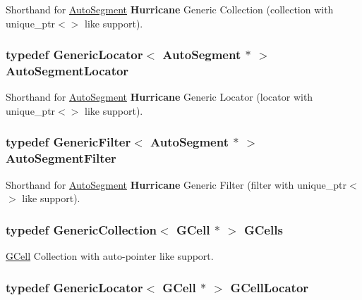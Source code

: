 Shorthand for \hyperlink{classKatabatic_1_1AutoSegment}{Auto\-Segment} {\bf Hurricane} Generic Collection (collection with {\ttfamily unique\-\_\-ptr$<$$>$} like support). \hypertarget{namespaceKatabatic_ace866cc8e09faf80f71a4087bb8e5870}{
\subsubsection[{Auto\-Segment\-Locator}]{\setlength{\rightskip}{0pt plus 5cm}typedef {\bf Generic\-Locator}$<$ {\bf Auto\-Segment} $\ast$ $>$ {\bf Auto\-Segment\-Locator}}}\label{namespaceKatabatic_ace866cc8e09faf80f71a4087bb8e5870}
Shorthand for \hyperlink{classKatabatic_1_1AutoSegment}{Auto\-Segment} {\bf Hurricane} Generic Locator (locator with {\ttfamily unique\-\_\-ptr$<$$>$} like support). \hypertarget{namespaceKatabatic_a13ffc994c98e1a878e61a927de0509c8}{
\subsubsection[{Auto\-Segment\-Filter}]{\setlength{\rightskip}{0pt plus 5cm}typedef {\bf Generic\-Filter}$<$ {\bf Auto\-Segment} $\ast$ $>$ {\bf Auto\-Segment\-Filter}}}\label{namespaceKatabatic_a13ffc994c98e1a878e61a927de0509c8}
Shorthand for \hyperlink{classKatabatic_1_1AutoSegment}{Auto\-Segment} {\bf Hurricane} Generic Filter (filter with {\ttfamily unique\-\_\-ptr$<$$>$} like support). \hypertarget{namespaceKatabatic_ab68f9dfbbc79fd999773beef8561bc31}{
\subsubsection[{G\-Cells}]{\setlength{\rightskip}{0pt plus 5cm}typedef {\bf Generic\-Collection}$<$ {\bf G\-Cell} $\ast$ $>$ {\bf G\-Cells}}}\label{namespaceKatabatic_ab68f9dfbbc79fd999773beef8561bc31}
\hyperlink{classKatabatic_1_1GCell}{G\-Cell} Collection with auto-\/pointer like support. \hypertarget{namespaceKatabatic_ae192ef170a0ad390902e435ac1e6796a}{
\subsubsection[{G\-Cell\-Locator}]{\setlength{\rightskip}{0pt plus 5cm}typedef {\bf Generic\-Locator}$<$ {\bf G\-Cell} $\ast$ $>$ {\bf G\-Cell\-Locator}}}\label{namespaceKatabatic_ae192ef170a0ad390902e435ac1e6796a}
